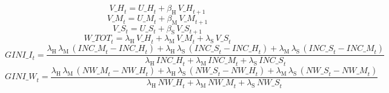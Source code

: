 \begin{dmath}
{V\_H}_{t}={U\_H}_{t}+{\beta_\mathrm{H}}\, {V\_H}_{t+1}
\end{dmath}
\begin{dmath}
{V\_M}_{t}={U\_M}_{t}+{\beta_\mathrm{M}}\, {V\_M}_{t+1}
\end{dmath}
\begin{dmath}
{V\_S}_{t}={U\_S}_{t}+{\beta_\mathrm{S}}\, {V\_S}_{t+1}
\end{dmath}
\begin{dmath}
{W\_TOT}_{t}={\lambda_\mathrm{H}}\, {V\_H}_{t}+{\lambda_\mathrm{M}}\, {V\_M}_{t}+{\lambda_\mathrm{S}}\, {V\_S}_{t}
\end{dmath}
\begin{dmath}
{GINI\_I}_{t}=\frac{{\lambda_\mathrm{H}}\, {\lambda_\mathrm{M}}\, \left({INC\_M}_{t}-{INC\_H}_{t}\right)+{\lambda_\mathrm{H}}\, {\lambda_\mathrm{S}}\, \left({INC\_S}_{t}-{INC\_H}_{t}\right)+{\lambda_\mathrm{M}}\, {\lambda_\mathrm{S}}\, \left({INC\_S}_{t}-{INC\_M}_{t}\right)}{{\lambda_\mathrm{H}}\, {INC\_H}_{t}+{\lambda_\mathrm{M}}\, {INC\_M}_{t}+{\lambda_\mathrm{S}}\, {INC\_S}_{t}}
\end{dmath}
\begin{dmath}
{GINI\_W}_{t}=\frac{{\lambda_\mathrm{H}}\, {\lambda_\mathrm{M}}\, \left({NW\_M}_{t}-{NW\_H}_{t}\right)+{\lambda_\mathrm{H}}\, {\lambda_\mathrm{S}}\, \left({NW\_S}_{t}-{NW\_H}_{t}\right)+{\lambda_\mathrm{M}}\, {\lambda_\mathrm{S}}\, \left({NW\_S}_{t}-{NW\_M}_{t}\right)}{{\lambda_\mathrm{H}}\, {NW\_H}_{t}+{\lambda_\mathrm{M}}\, {NW\_M}_{t}+{\lambda_\mathrm{S}}\, {NW\_S}_{t}}
\end{dmath}
